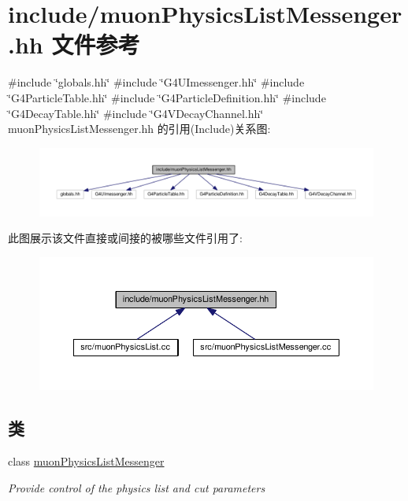 \hypertarget{muonPhysicsListMessenger_8hh}{}\section{include/muon\+Physics\+List\+Messenger.hh 文件参考}
\label{muonPhysicsListMessenger_8hh}
{\ttfamily \#include \char`\"{}globals.\+hh\char`\"{}}\newline
{\ttfamily \#include \char`\"{}G4\+U\+Imessenger.\+hh\char`\"{}}\newline
{\ttfamily \#include \char`\"{}G4\+Particle\+Table.\+hh\char`\"{}}\newline
{\ttfamily \#include \char`\"{}G4\+Particle\+Definition.\+hh\char`\"{}}\newline
{\ttfamily \#include \char`\"{}G4\+Decay\+Table.\+hh\char`\"{}}\newline
{\ttfamily \#include \char`\"{}G4\+V\+Decay\+Channel.\+hh\char`\"{}}\newline
muon\+Physics\+List\+Messenger.\+hh 的引用(Include)关系图\+:\nopagebreak
\begin{figure}[H]
\begin{center}
\leavevmode
\includegraphics[width=350pt]{muonPhysicsListMessenger_8hh__incl}
\end{center}
\end{figure}
此图展示该文件直接或间接的被哪些文件引用了\+:\nopagebreak
\begin{figure}[H]
\begin{center}
\leavevmode
\includegraphics[width=350pt]{muonPhysicsListMessenger_8hh__dep__incl}
\end{center}
\end{figure}
\subsection*{类}
\begin{DoxyCompactItemize}
\item 
class \hyperlink{classmuonPhysicsListMessenger}{muon\+Physics\+List\+Messenger}
\begin{DoxyCompactList}\small\item\em Provide control of the physics list and cut parameters \end{DoxyCompactList}\end{DoxyCompactItemize}
